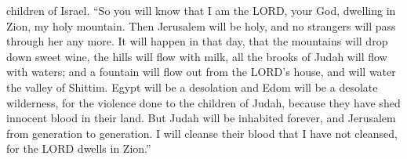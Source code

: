 children of Israel.  ``So you will know that I am the LORD,
your God, dwelling in Zion, my holy mountain. Then Jerusalem will be
holy, and no strangers will pass through her any more.  It
will happen in that day, that the mountains will drop down sweet wine,
the hills will flow with milk, all the brooks of Judah will flow with
waters; and a fountain will flow out from the LORD's house, and will
water the valley of Shittim.  Egypt will be a desolation
and Edom will be a desolate wilderness, for the violence done to the
children of Judah, because they have shed innocent blood in their land.
 But Judah will be inhabited forever, and Jerusalem from
generation to generation.  I will cleanse their blood that
I have not cleansed, for the LORD dwells in Zion.''
